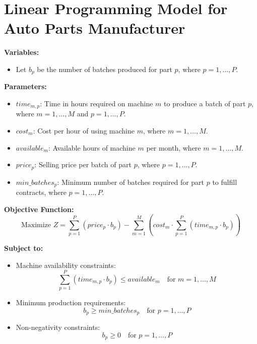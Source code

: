 \documentclass{article}
\begin{document}
\section*{Linear Programming Model for Auto Parts Manufacturer}

\textbf{Variables:}
\begin{itemize}
    \item Let $b_p$ be the number of batches produced for part $p$, where $p = 1, \ldots, P$.
\end{itemize}

\textbf{Parameters:}
\begin{itemize}
    \item $time_{m,p}$: Time in hours required on machine $m$ to produce a batch of part $p$, where $m = 1, \ldots, M$ and $p = 1, \ldots, P$.
    \item $cost_{m}$: Cost per hour of using machine $m$, where $m = 1, \ldots, M$.
    \item $available_{m}$: Available hours of machine $m$ per month, where $m = 1, \ldots, M$.
    \item $price_{p}$: Selling price per batch of part $p$, where $p = 1, \ldots, P$.
    \item $min\_batches_{p}$: Minimum number of batches required for part $p$ to fulfill contracts, where $p = 1, \ldots, P$.
\end{itemize}

\textbf{Objective Function:}
\[
\text{Maximize } Z = \sum_{p=1}^{P} (price_p \cdot b_p) - \sum_{m=1}^{M} \left( cost_m \cdot \sum_{p=1}^{P} (time_{m,p} \cdot b_p) \right)
\]

\textbf{Subject to:}
\begin{itemize}
    \item Machine availability constraints:
    \[
    \sum_{p=1}^{P} (time_{m,p} \cdot b_p) \leq available_m \quad \text{for } m = 1, \ldots, M
    \]
    \item Minimum production requirements:
    \[
    b_p \geq min\_batches_p \quad \text{for } p = 1, \ldots, P
    \]
    \item Non-negativity constraints:
    \[
    b_p \geq 0 \quad \text{for } p = 1, \ldots, P
    \]
\end{itemize}
\end{document}
